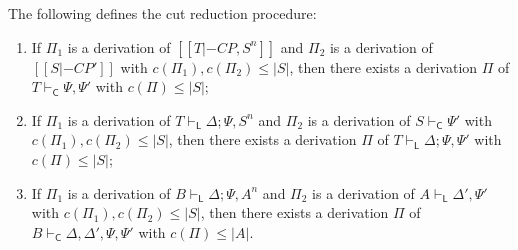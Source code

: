 \begin{lemma}
  \label{lemma:cut_reduction}
  The following defines the cut reduction procedure:
  \begin{enumerate}
  \item If $\Pi_1$ is a derivation of $[[T |-C P, S^n]]$ and  $\Pi_2$ is a derivation of $[[S |-C P']]$ with 
    $c(\Pi_1), c(\Pi_2) \leq |S|$, then there exists a derivation $\Pi$ of $T\vdash_{\mathsf{C}} \Psi, \Psi'$ with $c(\Pi) \leq |S|$;
  \item If $\Pi_1$ is a derivation of $T \vdash_{\mathsf{L}} \Delta; \Psi, S^n$ and  $\Pi_2$ is a derivation of $S \vdash_{\mathsf{C}}\Psi'$ with 
    $c(\Pi_1), c(\Pi_2) \leq |S|$, then there exists a derivation $\Pi$ of $T\vdash_{\mathsf{L}} \Delta; \Psi, \Psi'$ with $c(\Pi) \leq |S|$;
  \item If $\Pi_1$ is a derivation of $B\vdash_{\mathsf{L}} \Delta; \Psi, A^n$ and  $\Pi_2$ is a derivation of $A \vdash_{\mathsf{L}}\Delta', \Psi'$ with $c(\Pi_1), c(\Pi_2) \leq |S|$,
    then there exists a derivation $\Pi$ of $B\vdash_{\mathsf{C}}\Delta, \Delta', \Psi, \Psi'$ with $c(\Pi) \leq |A|$.
  \end{enumerate}
\end{lemma}

